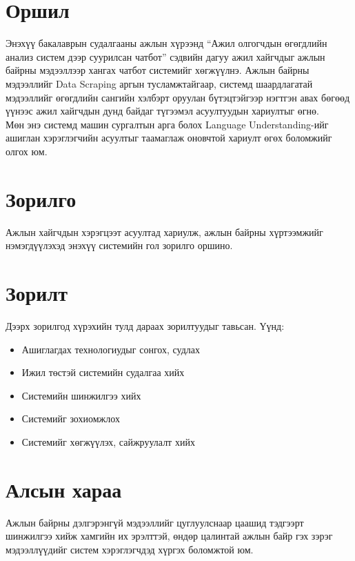 \section{Оршил}
\quad Энэхүү бакалаврын судалгааны ажлын хүрээнд ``Ажил олгогчдын өгөгдлийн анализ систем дээр суурилсан чатбот'' сэдвийн дагуу ажил хайгчдыг ажлын байрны мэдээллээр хангах чатбот системийг хөгжүүлнэ. Ажлын байрны мэдээллийг Data Scraping аргын тусламжтайгаар, системд шаардлагатай мэдээллийг өгөгдлийн сангийн хэлбэрт оруулан бүтэцтэйгээр нэгтгэн авах бөгөөд үүнээс ажил хайгчдын дунд байдаг түгээмэл асуултуудын хариултыг өгнө.
\\Мөн энэ системд машин сургалтын арга болох Language Understanding-ийг ашиглан хэрэглэгчийн асуултыг таамаглаж оновчтой хариулт өгөх боломжийг олгох юм. 
\section{Зорилго}
\quad Ажлын хайгчдын хэрэгцээт асуултад хариулж, ажлын байрны хүртээмжийг нэмэгдүүлэхэд энэхүү системийн гол зорилго оршино.
\section{Зорилт}
\quad Дээрх зорилгод хүрэхийн тулд дараах зорилтуудыг тавьсан. Үүнд:
\begin{itemize}
	\item Ашиглагдах технологиудыг сонгох, судлах
	\item Ижил төстэй системийн судалгаа хийх
	\item Системийн шинжилгээ хийх
	\item Системийг зохиомжлох
	\item Системийг хөгжүүлэх, сайжруулалт хийх
\end{itemize}
\section{Алсын хараа}
\quad Ажлын байрны дэлгэрэнгүй мэдээллийг цуглуулснаар цаашид тэдгээрт шинжилгээ хийж хамгийн их эрэлттэй, өндөр цалинтай ажлын байр гэх зэрэг мэдээллүүдийг систем хэрэглэгчдэд хүргэх боломжтой юм. 